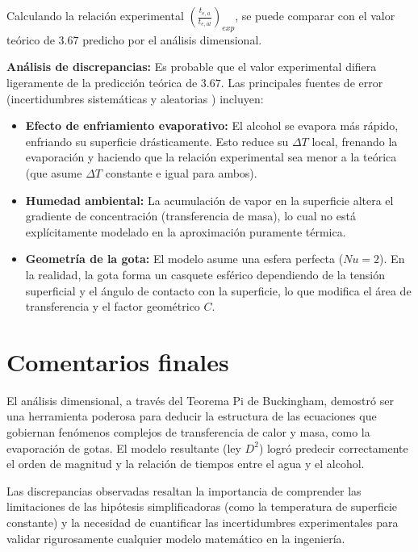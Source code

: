 \documentclass[12pt, letterpaper, onecolumn]{article}
\begin{document}
Calculando la relación experimental $\left( \frac{t_{e,a}}{t_{e,al}} \right)_{exp}$, se puede comparar con el valor teórico de $3.67$ predicho por el análisis dimensional. 

\textbf{Análisis de discrepancias:}
Es probable que el valor experimental difiera ligeramente de la predicción teórica de $3.67$. Las principales fuentes de error (incertidumbres sistemáticas y aleatorias \citep{taylor1997}) incluyen:
\begin{itemize}
  \item \textbf{Efecto de enfriamiento evaporativo:} El alcohol se evapora más rápido, enfriando su superficie drásticamente. Esto reduce su $\Delta T$ local, frenando la evaporación y haciendo que la relación experimental sea menor a la teórica (que asume $\Delta T$ constante e igual para ambos).
  \item \textbf{Humedad ambiental:} La acumulación de vapor en la superficie altera el gradiente de concentración (transferencia de masa), lo cual no está explícitamente modelado en la aproximación puramente térmica.
  \item \textbf{Geometría de la gota:} El modelo asume una esfera perfecta ($Nu=2$). En la realidad, la gota forma un casquete esférico dependiendo de la tensión superficial y el ángulo de contacto con la superficie, lo que modifica el área de transferencia y el factor geométrico $C$.
\end{itemize}

\section{Comentarios finales}\label{sec:conclusiones}

El análisis dimensional, a través del Teorema Pi de Buckingham, demostró ser una herramienta poderosa para deducir la estructura de las ecuaciones que gobiernan fenómenos complejos de transferencia de calor y masa, como la evaporación de gotas. El modelo resultante (ley $D^2$) logró predecir correctamente el orden de magnitud y la relación de tiempos entre el agua y el alcohol. 

Las discrepancias observadas resaltan la importancia de comprender las limitaciones de las hipótesis simplificadoras (como la temperatura de superficie constante) y la necesidad de cuantificar las incertidumbres experimentales para validar rigurosamente cualquier modelo matemático en la ingeniería.
\end{document}
